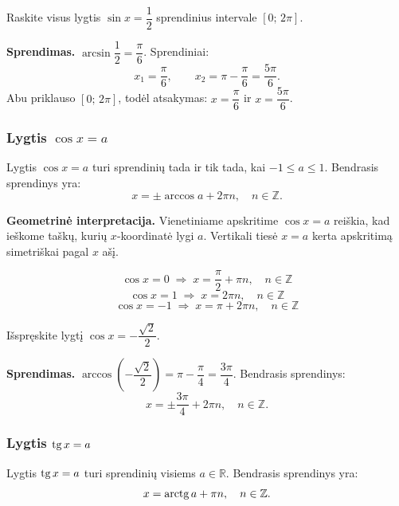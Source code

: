 \begin{example}
Raskite visus lygtis $\sin x = \dfrac{1}{2}$ sprendinius intervale $[0;\, 2\pi]$.

\textbf{Sprendimas.} $\arcsin\dfrac{1}{2} = \dfrac{\pi}{6}$. Sprendiniai:
\[
    x_1 = \frac{\pi}{6}, \qquad x_2 = \pi - \frac{\pi}{6} = \frac{5\pi}{6}.
\]
Abu priklauso $[0;\, 2\pi]$, todėl atsakymas: $x = \dfrac{\pi}{6}$ ir 
$x = \dfrac{5\pi}{6}$.
\end{example}

\subsubsection*{Lygtis \(\cos x = a\)}

\begin{theorem}
Lygtis $\cos x = a$ turi sprendinių tada ir tik tada, kai $-1 \leq a \leq 1$. 
Bendrasis sprendinys yra:
\[
    x = \pm\arccos a + 2\pi n, \quad n \in \mathbb{Z}.
\]
\end{theorem}

\noindent \textbf{Geometrinė interpretacija.} Vienetiniame apskritime $\cos x = a$ 
reiškia, kad ieškome taškų, kurių $x$-koordinatė lygi $a$. Vertikali tiesė $x = a$ 
kerta apskritimą simetriškai pagal $x$ ašį.

\begin{tcolorbox}[colback=blue!5, colframe=blue!50!black, title=Ypatingos reikšmės]
\[
\cos x = 0 \;\Rightarrow\; x = \frac{\pi}{2} + \pi n, \quad n \in \mathbb{Z}
\]
\[
\cos x = 1 \;\Rightarrow\; x = 2\pi n, \quad n \in \mathbb{Z}
\]
\[
\cos x = -1 \;\Rightarrow\; x = \pi + 2\pi n, \quad n \in \mathbb{Z}
\]
\end{tcolorbox}

\begin{example}
Išspręskite lygtį $\cos x = -\dfrac{\sqrt{2}}{2}$.

\textbf{Sprendimas.} $\arccos\!\left(-\dfrac{\sqrt{2}}{2}\right) = \pi - \dfrac{\pi}{4} 
= \dfrac{3\pi}{4}$. Bendrasis sprendinys:
\[
    x = \pm\frac{3\pi}{4} + 2\pi n, \quad n \in \mathbb{Z}.
\]
\end{example}

\subsubsection*{Lygtis \(\operatorname{tg} x = a\)}

\begin{theorem}
Lygtis $\operatorname{tg} x = a$ turi sprendinių visiems $a \in \mathbb{R}$. 
Bendrasis sprendinys yra:
\[
    x = \operatorname{arctg} a + \pi n, \quad n \in \mathbb{Z}.
\]
\end{theorem}

